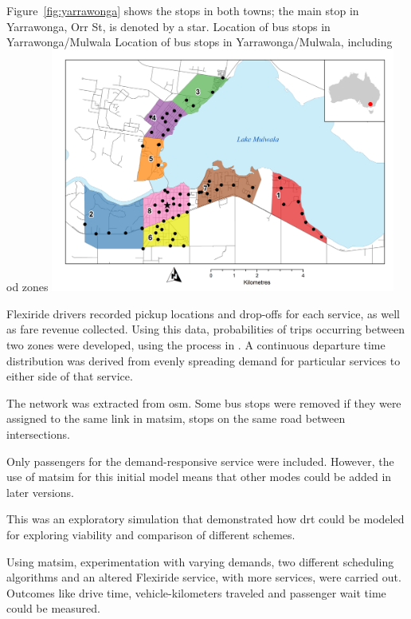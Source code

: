 Figure~\ref{fig:yarrawonga} shows the stops in both towns; the main stop in Yarrawonga, Orr St, is denoted by a star.
%
\createfigure%
{Location of bus stops in Yarrawonga/Mulwala}%
{Location of bus stops in Yarrawonga/Mulwala, including \gls{od} zones}%
{\label{fig:yarrawonga}}%
{\includegraphics[width=0.85\textwidth, angle=0]{./scenarios/figures/yarrawonga_high.png}}%
{}
%

Flexiride drivers recorded pickup locations and drop-offs for each service,
as well as fare revenue collected. Using this data, probabilities of trips
occurring between two zones were developed, using the process in
\citet[][]{Deflorio_ITSIET_2011}. A continuous departure time distribution was
derived from evenly spreading demand for particular services to either side
of that service. 


The network was extracted from \gls{osm}. Some bus stops were removed if they were assigned to the same link in \gls{matsim}, \eg stops on the same road between intersections.

Only passengers for the demand-responsive service were included. However, the use of \gls{matsim} for this initial model means that other modes could be added in later versions.


This was an exploratory simulation that demonstrated how \gls{drt} could be modeled for exploring viability and comparison of different schemes.

Using \gls{matsim}, experimentation with varying demands, two different scheduling
algorithms and an altered Flexiride service, with more services, were
carried out. Outcomes like drive time, vehicle-kilometers traveled and
passenger wait time could be measured.

